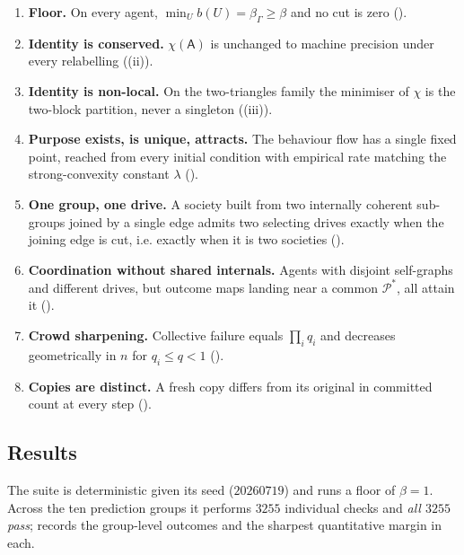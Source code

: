 \documentclass[11pt,twocolumn,a4paper]{article}
\newcommand{\Agent}{\mathsf{A}}
\newcommand{\Self}{\Gamma}          %
\newcommand{\floorc}{\beta}          %
\newcommand{\Char}{\chi}             %
\newcommand{\Purp}{\mathcal{P}}      %
\begin{document}
\begin{enumerate}[label=\textbf{(V\arabic*)},leftmargin=*]
\item \textbf{Floor.} On every agent, $\min_U b(U)=\floorc_\Self\ge\floorc$
and no cut is zero ().
\item \textbf{Identity is conserved.} $\Char(\Agent)$ is unchanged to
machine precision under every relabelling ((ii)).
\item \textbf{Identity is non-local.} On the two-triangles family the
minimiser of $\Char$ is the two-block partition, never a singleton
((iii)).
\item \textbf{Purpose exists, is unique, attracts.} The behaviour flow has
a single fixed point, reached from every initial condition with empirical
rate matching the strong-convexity constant $\lambda$
().
\item \textbf{One group, one drive.} A society built from two internally
coherent sub-groups joined by a single edge admits two selecting drives
exactly when the joining edge is cut, i.e. exactly when it is two
societies ().
\item \textbf{Coordination without shared internals.} Agents with disjoint
self-graphs and different drives, but outcome maps landing near a common
$\Purp^\ast$, all attain it ().
\item \textbf{Crowd sharpening.} Collective failure equals $\prod_i q_i$
and decreases geometrically in $n$ for $q_i\le q<1$ ().
\item \textbf{Copies are distinct.} A fresh copy differs from its original
in committed count at every step ().
\end{enumerate}

\subsection{Results}

The suite is deterministic given its seed ($20260719$) and runs a floor of
$\floorc=1$. Across the ten prediction groups it performs $3255$ individual
checks and \emph{all $3255$ pass};  records the
group-level outcomes and the sharpest quantitative margin in each.
\end{document}
